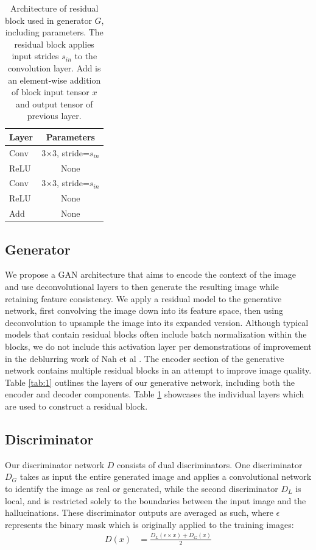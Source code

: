 \documentclass{article}
\begin{document}
\begin{table}[h] 
  \centering  
    \begin{tabular}{lc}  
    \hline
    \textbf{Layer} & \textbf{Parameters}\\ 
    \hline \hline
      Conv & 3$\times$3, stride=$s_{in}$ \\
    \hline
      ReLU & None \\
    \hline
      Conv & 3$\times$3, stride=$s_{in}$ \\
    \hline
      ReLU & None \\
    \hline
      Add & None \\
    \hline
    \end{tabular}
  
  \caption{Architecture of residual block used in generator $G$, including parameters. The residual block applies input strides $s_{in}$ to the convolution layer. Add is an element-wise addition of block input tensor $x$ and output tensor of previous layer.} 
  \label{tab:2}
\end{table}

\subsection{Generator}
We propose a GAN architecture that aims to encode the context of the image and use deconvolutional layers to then generate the resulting image while retaining feature consistency. We apply a residual model to the generative network, first convolving the image down into its feature space, then using deconvolution to upsample the image into its expanded version. Although typical models that contain residual blocks often include batch normalization within the blocks, we do not include this activation layer per demonstrations of improvement in the deblurring work of Nah et al \citep{nah_deep_2018}. The encoder section of the generative network contains multiple residual blocks in an attempt to improve image quality. Table \ref{tab:1} outlines the layers of our generative network, including both the encoder and decoder components. Table \ref{tab:2} showcases the individual layers which are used to construct a residual block.

\subsection{Discriminator}
Our discriminator network $D$ consists of dual discriminators. One discriminator $D_G$ takes as input the entire generated image and applies a convolutional network to identify the image as real or generated, while the second discriminator $D_L$ is local, and is restricted solely to the boundaries between the input image and the hallucinations. These discriminator outputs are averaged as such, where $\epsilon$ represents the binary mask which is originally applied to the training images: 
\begin{align}
	D(x) &= \frac{D_L(\epsilon \times x) + D_G(x)}{2}
\end{align}
\end{document}
